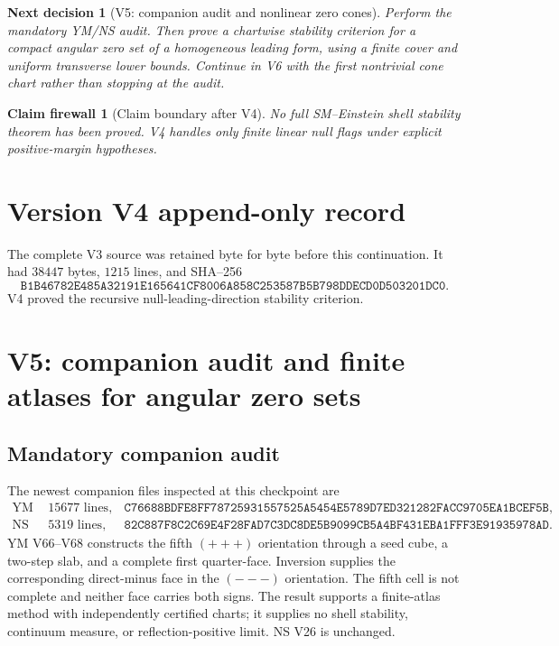 \documentclass[11pt]{article}
\newtheorem{firewall}[theorem]{Claim firewall}
\newtheorem{decision}[theorem]{Next decision}
\theoremstyle{remark}
\begin{document}
\begin{decision}[V5: companion audit and nonlinear zero cones]
\label{dec:v17v4-next}
Perform the mandatory YM/NS audit.  Then prove a chartwise stability
criterion for a compact angular zero set of a homogeneous leading
form, using a finite cover and uniform transverse lower bounds.
Continue in V6 with the first nontrivial cone chart rather than
stopping at the audit.
\end{decision}

\begin{firewall}[Claim boundary after V4]
\label{fire:v17v4}
No full SM--Einstein shell stability theorem has been proved.  V4
handles only finite linear null flags under explicit positive-margin
hypotheses.
\end{firewall}

\section*{Version V4 append-only record}
The complete V3 source was retained byte for byte before this
continuation.  It had \(38447\) bytes, \(1215\) lines, and SHA--256
\[
 \texttt{B1B46782E485A32191E165641CF8006A858C253587B5B798DDECD0D503201DC0}.
\]
V4 proved the recursive null-leading-direction stability criterion.


\section{V5: companion audit and finite atlases for angular zero sets}
\label{sec:v17v5}

\subsection{Mandatory companion audit}

The newest companion files inspected at this checkpoint are
\[
\begin{array}{lll}
\text{YM V68:}&15677\text{ lines},&
\texttt{C76688BDFE8FF78725931557525A5454E5789D7ED321282FACC9705EA1BCEF5B},\\
\text{NS V26:}&5319\text{ lines},&
\texttt{82C887F8C2C69E4F28FAD7C3DC8DE5B9099CB5A4BF431EBA1FFF3E91935978AD}.
\end{array}                                                    \tag{5.1}
\]
YM V66--V68 constructs the fifth \((+++)\) orientation through a
seed cube, a two-step slab, and a complete first quarter-face.
Inversion supplies the corresponding direct-minus face in the
\((---)\) orientation.  The fifth cell is not complete and neither
face carries both signs.  The result supports a finite-atlas method
with independently certified charts; it supplies no shell stability,
continuum measure, or reflection-positive limit.  NS V26 is
unchanged.
\end{document}
